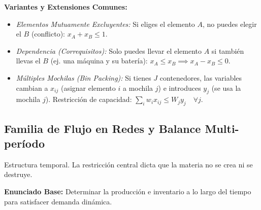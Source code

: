 \documentclass{article}
\begin{document}
	\textbf{Variantes y Extensiones Comunes:}
	\begin{itemize}
		\item \textit{Elementos Mutuamente Excluyentes:} Si eliges el elemento $A$, no puedes elegir el $B$ (conflicto): $x_A + x_B \leq 1$.
		\item \textit{Dependencia (Correquisitos):} Solo puedes llevar el elemento $A$ si también llevas el $B$ (ej. una máquina y su batería): $x_A \leq x_B \implies x_A - x_B \leq 0$.
		\item \textit{Múltiples Mochilas (Bin Packing):} Si tienes $J$ contenedores, las variables cambian a $x_{ij}$ (asignar elemento $i$ a mochila $j$) e introduces $y_j$ (se usa la mochila $j$). Restricción de capacidad: $\sum_i w_i x_{ij} \leq W_j y_j \quad \forall j$.
	\end{itemize}
	
	\newpage
	
	\subsection{Familia de Flujo en Redes y Balance Multi-período}
	Estructura temporal. La restricción central dicta que la materia no se crea ni se destruye.
	
	\textbf{Enunciado Base:} Determinar la producción e inventario a lo largo del tiempo para satisfacer demanda dinámica.
	
\end{document}
